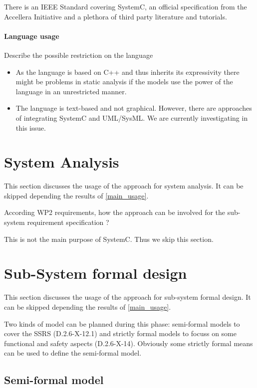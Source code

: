 There is an IEEE Standard covering SystemC, an official specification from the Accellera Initiative and a plethora of third party literature and tutorials.

\paragraph{Language usage} Describe the possible restriction on the language

\begin{itemize}
\item As the language is based on C++ and thus inherits its expressivity there might be problems in static analysis if the models use the power of the language in an unrestricted manner.
\item The language is text-based and not graphical. However, there are approaches of integrating SystemC and UML/SysML. We are currently investigating in this issue.
\end{itemize}


\section{System Analysis}
This section discusses the usage of the approach for system analysis.
It can be skipped depending the results of \ref{main_usage}.

According WP2 requirements, how the approach can be involved for the sub-system requirement specification ?

\begin{author_comment}
This is not the main purpose of SystemC. Thus we skip this section.
\end{author_comment}

\section{Sub-System formal design}
This section discusses the usage of the approach for sub-system formal design.
It can be skipped depending the results of \ref{main_usage}.

Two kinds of model can be planned during this phase: semi-formal models to cover the SSRS (D.2.6-X-12.1) and strictly formal models to focuss on some functional and safety aspects (D.2.6-X-14). Obviously some strictly formal means can be used to define the semi-formal model.

\subsection{Semi-formal model}

